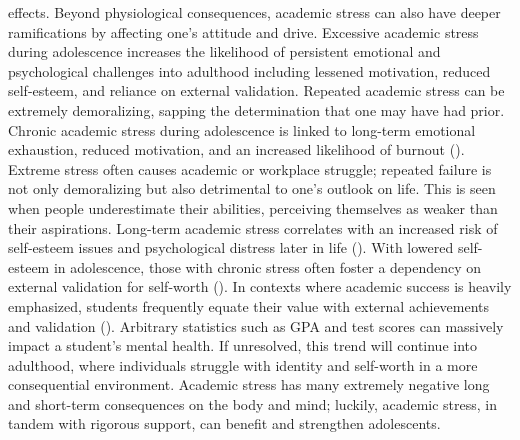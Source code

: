 effects. Beyond physiological consequences, academic stress can also have deeper ramifications by affecting one’s attitude and drive. Excessive academic stress during adolescence increases the likelihood of persistent emotional and psychological challenges into adulthood including lessened motivation, reduced self-esteem, and reliance on external validation. Repeated academic stress can be extremely demoralizing, sapping the determination that one may have had prior. Chronic academic stress during adolescence is linked to long-term emotional exhaustion, reduced motivation, and an increased likelihood of burnout (\cite{cordovaolivera2023}). Extreme stress often causes academic or workplace struggle; repeated failure is not only demoralizing but also detrimental to one’s outlook on life. This is seen when people underestimate their abilities, perceiving themselves as weaker than their aspirations. Long-term academic stress correlates with an increased risk of self-esteem issues and psychological distress later in life (\cite{almroth2019}). With lowered self-esteem in adolescence, those with chronic stress often foster a dependency on external validation for self-worth (\cite{cordovaolivera2023}). In contexts where academic success is heavily emphasized, students frequently equate their value with external achievements and validation (\cite{almroth2019}). Arbitrary statistics such as GPA and test scores can massively impact a student’s mental health. If unresolved, this trend will continue into adulthood, where individuals struggle with identity and self-worth in a more consequential environment. Academic stress has many extremely negative long and short-term consequences on the body and mind; luckily, academic stress, in tandem with rigorous support, can benefit and strengthen adolescents. 

